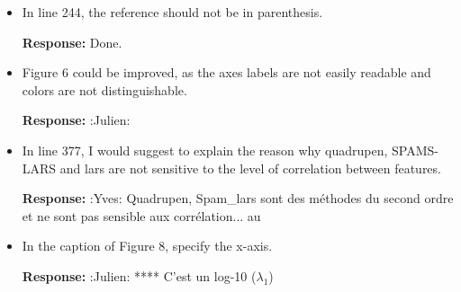 \documentclass[a4paper,11pt]{texMemo}
\newenvironment{comment}
{
   \par\medskip \color{black}%
   \textbf{Response: }}
{\medskip}
\newenvironment{remark}
{\begin{itshape} \color{gray}}
{\end{itshape}}
\begin{document}
\begin{itemize}
 \begin{comment}
   We followed the recommandation and improve the illustration of
   difference in support recovery (Figure 8) in using True Postive and
   False Negative and F-measure (with the corresponding citation of
   \cite{gasso2009recovering}).
 \end{comment}

\item 
  \begin{remark}
    In line 244, %
   the reference should not be in parenthesis.
  \end{remark}

  \begin{comment}
    Done.
  \end{comment}




\item 
  \begin{remark}
    Figure 6 could be improved, as the axes labels are not easily
    readable and colors are not distinguishable.
\end{remark}

\begin{comment}
  :Julien:
\end{comment}



\item
   \begin{remark}
     In line 377, I would suggest to explain the reason why quadrupen,
     SPAMS-LARS and lars are not sensitive to the level of correlation
     between features.
    \end{remark}

\begin{comment}
  :Yves: Quadrupen, Spam\_lars sont des méthodes du second ordre et ne
  sont pas sensible aux corrélation... au
\end{comment}


\item
  \begin{remark}
    In the caption of Figure 8, specify the x-axis.
  \end{remark}
  
\begin{comment}
    :Julien: 
**** C'est un log-10 ($\lambda_1$)
\end{comment}

\end{itemize}
\end{document}
